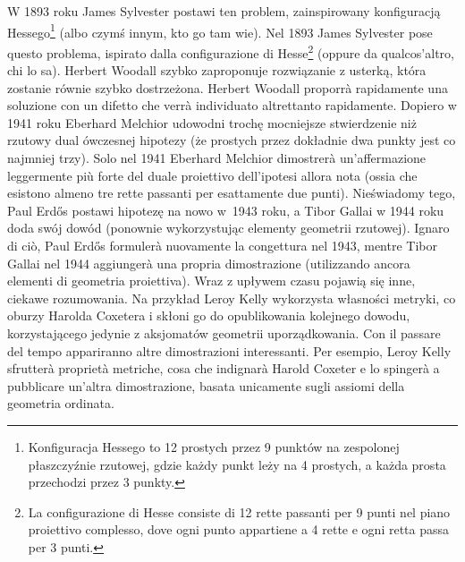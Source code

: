 W 1893 roku James Sylvester postawi ten problem, zainspirowany konfiguracją Hessego\footnote{Konfiguracja Hessego to 12 prostych przez 9 punktów na zespolonej płaszczyźnie rzutowej, gdzie każdy punkt leży na 4 prostych, a każda prosta przechodzi przez 3 punkty.} (albo czymś innym, kto go tam wie). %
Nel 1893 James Sylvester pose questo problema, ispirato dalla configurazione di Hesse\footnote{La configurazione di Hesse consiste di 12 rette passanti per 9 punti nel piano proiettivo complesso, dove ogni punto appartiene a 4 rette e ogni retta passa per 3 punti.} (oppure da qualcos'altro, chi lo sa). %
%
Herbert Woodall szybko zaproponuje rozwiązanie z usterką, która zostanie równie szybko dostrzeżona. %
Herbert Woodall proporrà rapidamente una soluzione con un difetto che verrà individuato altrettanto rapidamente. %
%
Dopiero w 1941 roku Eberhard Melchior udowodni trochę mocniejsze stwierdzenie niż rzutowy dual ówczesnej hipotezy (że prostych przez dokładnie dwa punkty jest co najmniej trzy). %
Solo nel 1941 Eberhard Melchior dimostrerà un'affermazione leggermente più forte del duale proiettivo dell'ipotesi allora nota (ossia che esistono almeno tre rette passanti per esattamente due punti). %
%
Nieświadomy tego, Paul Erdős postawi hipotezę na nowo w~1943 roku, a Tibor Gallai w 1944 roku doda swój dowód (ponownie wykorzystując elementy geometrii rzutowej). %
Ignaro di ciò, Paul Erdős formulerà nuovamente la congettura nel 1943, mentre Tibor Gallai nel 1944 aggiungerà una propria dimostrazione (utilizzando ancora elementi di geometria proiettiva). %
%
%
Wraz z upływem czasu pojawią się inne, ciekawe rozumowania. %
Na przykład Leroy Kelly wykorzysta własności metryki, co oburzy Harolda Coxetera \cite[s. 199-201]{coxeter_1967} i skłoni go do opublikowania kolejnego dowodu, korzystającego jedynie z aksjomatów geometrii uporządkowania. %
Con il passare del tempo appariranno altre dimostrazioni interessanti. %
Per esempio, Leroy Kelly sfrutterà proprietà metriche, cosa che indignarà Harold Coxeter \cite[p. 199-201]{coxeter_1967} e lo spingerà a pubblicare un'altra dimostrazione, basata unicamente sugli assiomi della geometria ordinata. %
%
